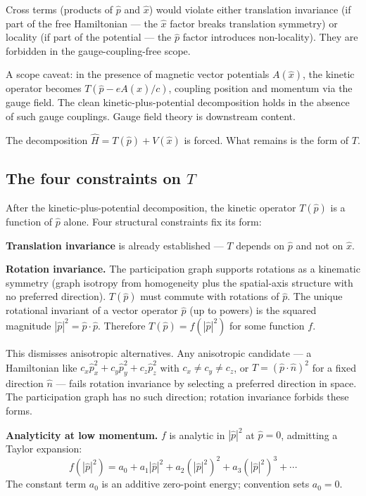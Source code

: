 \documentclass[11pt,a4paper]{article}
\begin{document}
Cross terms (products of $\hat{p}$ and $\hat{x}$) would violate either translation invariance (if part of the free Hamiltonian --- the $\hat{x}$ factor breaks translation symmetry) or locality (if part of the potential --- the $\hat{p}$ factor introduces non-locality). They are forbidden in the gauge-coupling-free scope.

A scope caveat: in the presence of magnetic vector potentials $A(\hat{x})$, the kinetic operator becomes $T(\hat{p} - eA(\hat{x})/c)$, coupling position and momentum via the gauge field. The clean kinetic-plus-potential decomposition holds in the absence of such gauge couplings. Gauge field theory is downstream content.

The decomposition $\hat{H} = T(\hat{p}) + V(\hat{x})$ is forced. What remains is the form of $T$.

\subsection{The four constraints on $T$}

After the kinetic-plus-potential decomposition, the kinetic operator $T(\hat{p})$ is a function of $\hat{p}$ alone. Four structural constraints fix its form:

\textbf{Translation invariance} is already established --- $T$ depends on $\hat{p}$ and not on $\hat{x}$.

\textbf{Rotation invariance.} The participation graph supports rotations as a kinematic symmetry (graph isotropy from homogeneity plus the spatial-axis structure with no preferred direction). $T(\hat{p})$ must commute with rotations of $\hat{p}$. The unique rotational invariant of a vector operator $\hat{p}$ (up to powers) is the squared magnitude $|\hat{p}|^{2} = \hat{p}\cdot\hat{p}$. Therefore $T(\hat{p}) = f(|\hat{p}|^{2})$ for some function $f$.

This dismisses anisotropic alternatives. Any anisotropic candidate --- a Hamiltonian like $c_x \hat{p}_x^{2} + c_y \hat{p}_y^{2} + c_z \hat{p}_z^{2}$ with $c_x \neq c_y \neq c_z$, or $T = (\hat{p}\cdot\hat{n})^{2}$ for a fixed direction $\hat{n}$ --- fails rotation invariance by selecting a preferred direction in space. The participation graph has no such direction; rotation invariance forbids these forms.

\textbf{Analyticity at low momentum.} $f$ is analytic in $|\hat{p}|^{2}$ at $\hat{p} = 0$, admitting a Taylor expansion:
\[
f(|\hat{p}|^{2}) = a_0 + a_1 |\hat{p}|^{2} + a_2 (|\hat{p}|^{2})^{2} + a_3 (|\hat{p}|^{2})^{3} + \cdots
\]
The constant term $a_0$ is an additive zero-point energy; convention sets $a_0 = 0$.
\end{document}
